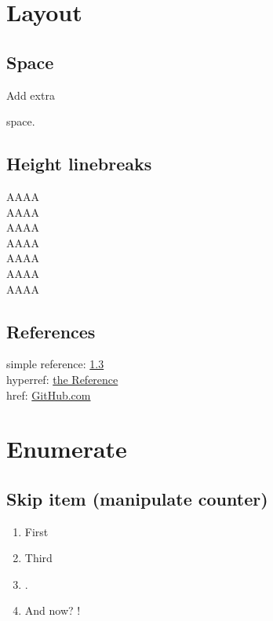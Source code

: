 \documentclass[a4paper, 11pt]{article}
\begin{document}
	    
	\section{Layout}\label{sec:layout}
		\subsection{Space}
			Add extra
			
			\vspace{2\baselineskip}
			
			space.
			
		\subsection{Height linebreaks}
			AAAA \\
			AAAA \\[.1ex]
			AAAA \\[1ex]			
			AAAA \\[2ex]			
			AAAA \\[5ex]				
			AAAA \\[1.5cm]		
			AAAA

		\subsection{References}
			\label{theLabel}
			simple reference: \ref{theLabel} \\
			hyperref: \hyperref[theLabel]{the Reference} \\
			href: \href{https://github.com}{GitHub.com}

	\section{Enumerate}\label{sec:enumerate}
		\subsection{Skip item (manipulate counter)}
		\begin{enumerate}
			\item First
			\addtocounter{enumi}{1}
			\item Third
			\item {}.
			\setcounter{enumi}{41}
			\item And now? \theenumi!
		\end{enumerate}
\end{document}

